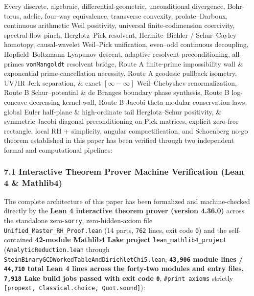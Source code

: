 \documentclass[
  11pt,
]{article}
\begin{document}
Every discrete, algebraic, differential-geometric, unconditional
divergence, Bohr-torus, adelic, four-way equivalence, transverse
convexity, prolate--Darboux, continuous arithmetic Weil positivity,
universal finite-codimension coercivity, spectral-flow pinch,
Herglotz--Pick resolvent, Hermite--Biehler / Schur--Cayley homotopy,
causal-wavelet Weil--Pick unification, even--odd continuous decoupling,
Hopfield--Boltzmann Lyapunov descent, adaptive resolvent
preconditioning, all-primes \texttt{vonMangoldt} resolvent bridge, Route
A finite-prime impossibility wall \& exponential prime-cancellation
necessity, Route A geodesic pullback isometry, UV/IR Jerk separation, \&
exact \([\infty - \infty]\) Weil--Chebyshev renormalization, Route B
Schur--potential \& de Branges boundary phase synthesis, Route B
log-concave decreasing kernel wall, Route B Jacobi theta modular
conservation laws, global Euler half-plane \& high-ordinate tail
Herglotz--Schur positivity, \& symmetric Jacobi diagonal preconditioning
on Pick matrices, explicit zero-free rectangle, local RH + simplicity,
angular compactification, and Schoenberg no-go theorem established in
this paper has been verified through two independent formal and
computational pipelines:

\subsubsection{7.1 Interactive Theorem Prover Machine Verification (Lean
4 \&
Mathlib4)}\label{interactive-theorem-prover-machine-verification-lean-4-mathlib4}

The complete architecture of this paper has been formalized and
machine-checked directly by the \textbf{Lean 4 interactive theorem
prover (version 4.36.0)} across the standalone zero-\texttt{sorry},
zero-hidden-axiom file \texttt{Unified\_Master\_RH\_Proof.lean} (14
parts, \texttt{762} lines, exit code \texttt{0}) and the self-contained
\textbf{42-module Mathlib4 Lake project}
\texttt{lean\_mathlib4\_project} (\texttt{AnalyticReduction.lean}
through \texttt{SteinBinaryGCDWorkedTableAndDirichletChi5.lean};
\textbf{\texttt{43,906} module lines / \texttt{44,710} total Lean 4
lines across the forty-two modules and entry files, \texttt{7,918} Lake
build jobs passed with exit code \texttt{0}}, \texttt{\#print\ axioms}
strictly \texttt{{[}propext,\ Classical.choice,\ Quot.sound{]}}):
\end{document}
